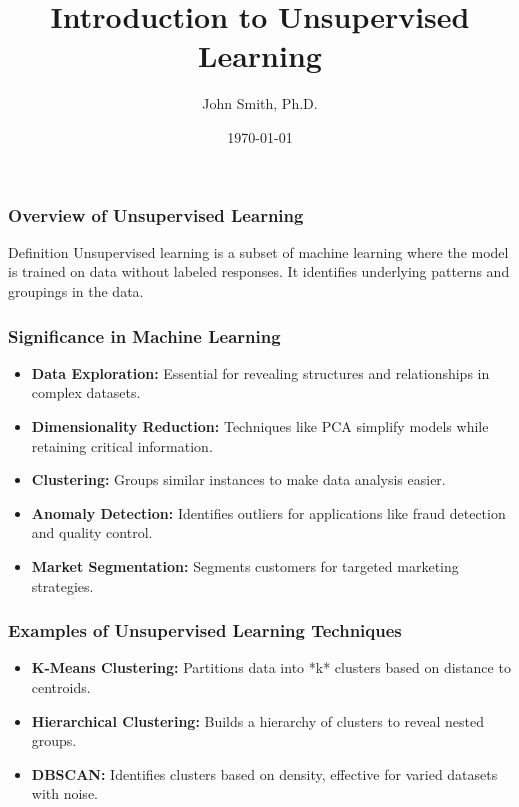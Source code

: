 \documentclass[aspectratio=169]{beamer}
\begin{document}
\frame{\titlepage}

\begin{frame}[fragile]
    \title{Introduction to Unsupervised Learning}
    \author{John Smith, Ph.D.}
    \date{\today}
    \maketitle
\end{frame}

\begin{frame}[fragile]
    \frametitle{Overview of Unsupervised Learning}
    \begin{block}{Definition}
        Unsupervised learning is a subset of machine learning where the model is trained on data without labeled responses. It identifies underlying patterns and groupings in the data.
    \end{block}
\end{frame}

\begin{frame}[fragile]
    \frametitle{Significance in Machine Learning}
    \begin{itemize}
        \item \textbf{Data Exploration:} Essential for revealing structures and relationships in complex datasets.
        \item \textbf{Dimensionality Reduction:} Techniques like PCA simplify models while retaining critical information.
        \item \textbf{Clustering:} Groups similar instances to make data analysis easier.
        \item \textbf{Anomaly Detection:} Identifies outliers for applications like fraud detection and quality control.
        \item \textbf{Market Segmentation:} Segments customers for targeted marketing strategies.
    \end{itemize}
\end{frame}

\begin{frame}[fragile]
    \frametitle{Examples of Unsupervised Learning Techniques}
    \begin{itemize}
        \item \textbf{K-Means Clustering:} Partitions data into *k* clusters based on distance to centroids.
        \item \textbf{Hierarchical Clustering:} Builds a hierarchy of clusters to reveal nested groups.
        \item \textbf{DBSCAN:} Identifies clusters based on density, effective for varied datasets with noise.
    \end{itemize}
\end{frame}
\end{document}
